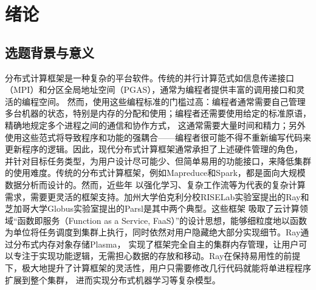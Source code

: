 
\chapter{绪论}
\label{cha:introduction}
\section{选题背景与意义}
\label{sec:background}

分布式计算框架是一种复杂的平台软件。传统的并行计算范式如信息传递接口（MPI）和分区全局地址空间（PGAS），通常为编程者提供丰富的调用接口和灵活的编程空间。
然而，使用这些编程标准的门槛过高：编程者通常需要自己管理多台机器的状态，特别是内存的分配和使用；编程者还需要使用给定的标准原语，精确地规定多个进程之间的通信和协作方式，
这通常需要大量时间和精力；另外使用这些范式将导致程序和功能的强耦合——编程者很可能不得不重新编写代码来更新程序的逻辑。因此，现代分布式计算框架通常承担了上述硬件管理的角色，
并针对目标任务类型，为用户设计尽可能少、但简单易用的功能接口，来降低集群的使用难度。传统的分布式计算框架，例如Mapreduce和Spark，都是面向大规模数据分析而设计的。然而，近些年
以强化学习、复杂工作流等为代表的复杂计算需求，需要更灵活的框架支持。加州大学伯克利分校RISELab实验室提出的Ray和芝加哥大学Globus实验室提出的Parsl是其中两个典型。这些框架
吸取了云计算领域“函数即服务（Function as a Service, FaaS）”的设计思想，能够细粒度地以函数为单位将任务调度到集群上执行，同时依然对用户隐藏绝大部分实现细节。Ray通过分布式内存对象存储Plasma，
实现了框架完全自主的集群内存管理，让用户可以专注于实现功能逻辑，无需担心数据的存放和移动。Ray在保持易用性的前提下，极大地提升了计算框架的灵活性，用户只需要修改几行代码就能将单进程程序扩展到整个集群，
进而实现分布式机器学习等复杂模型。

